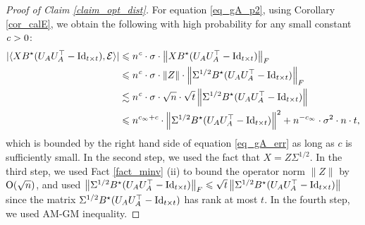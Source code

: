 \begin{proof}[Proof of Claim \ref{claim_opt_dist}]
	For equation \eqref{eq_gA_p2}, 
	using Corollary \ref{cor_calE}, we obtain the following with high probability for any small constant ${\mathit{c}}>0$:
	\begin{align}
		|\langle XB^{\star} (U_AU_A^{\top} - \operatorname{Id}_{t\times t}), \mathcal{E} \rangle| &\leqslant n^{\mathit{c}} \cdot \sigma \cdot \left\| XB^{\star} (U_AU_A^{\top} - \operatorname{Id}_{t\times t}) \right\|_{F} \nonumber \\
		&\leqslant n^{{\mathit{c}}} \cdot \sigma \cdot \|Z\| \cdot \left\| \Sigma^{1/2} B^{\star}(U_AU_A^{\top} -\operatorname{Id}_{t\times t}) \right\|_{F} \nonumber \\
		&\lesssim n^{{\mathit{c}}} \cdot \sigma \cdot \sqrt{n}\cdot \sqrt{t}\left\| \Sigma^{1/2} B^{\star}(U_AU_A^{\top} -\operatorname{Id}_{t\times t}) \right\| \nonumber \\
		&\leqslant  n^{c_\infty +c} \cdot \left\| \Sigma^{1/2} B^{\star} (U_AU_A^{\top} - \operatorname{Id}_{t\times t}) \right\|^2 + n^{-c_{\infty}} \cdot \sigma^2 \cdot n \cdot t,
		\label{eq_gA_err2}
	\end{align}
	which is bounded by the right hand side of equation \eqref{eq_gA_err} as long as $c$ is sufficiently small.
	In the second step, we used the fact that $X=Z\Sigma^{1/2}$.
	In the third step, we used Fact \ref{fact_minv} (ii) to bound the operator norm $\|Z\|$ by $\operatorname{O}(\sqrt{n})$, and used $\left\| \Sigma^{1/2} B^{\star}(U_AU_A^{\top} -\operatorname{Id}_{t\times t}) \right\|_{F}\leqslant \sqrt{t} \left\| \Sigma^{1/2} B^{\star}(U_AU_A^{\top} -\operatorname{Id}_{t\times t}) \right\|$ since the matrix $\Sigma^{1/2} B^{\star}(U_AU_A^{\top} -\operatorname{Id}_{t\times t})$ has rank at most $t$. In the fourth step, we used AM-GM inequality.


\end{proof}
